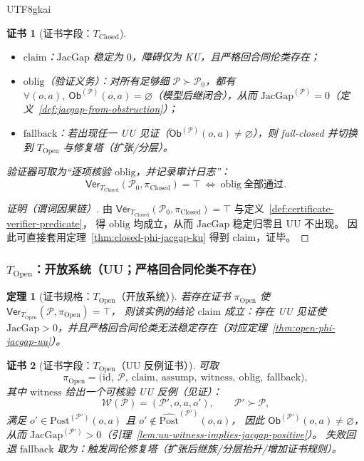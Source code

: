 \documentclass[12pt]{article}
\newtheorem{theorem}{定理}[section]
\newtheorem{Certificate}{证书}[section]
\newcommand{\JacGap}{\ensuremath{\mathrm{JacGap}}} %
\begin{document}
\begin{CJK*}{UTF8}{gkai}
\begin{Certificate}[证书字段：$T_{\mathrm{Closed}}$]
\begin{itemize}
  \item $\mathrm{claim}$：$\JacGap$ 稳定为 $0$，障碍仅为 KU，且严格回合同伦类存在；
  \item $\mathrm{oblig}$（验证义务）：对所有足够细 $\mathcal{P}\succ\mathcal{P}_0$，都有
  $\forall(o,a),\ \mathsf{Ob}^{(\mathcal{P})}(o,a)=\varnothing$（模型后继闭合），从而 $\JacGap^{(\mathcal{P})}=0$（定义~\ref{def:jacgap-from-obstruction}）；
  \item $\mathrm{fallback}$：若出现任一 UU 见证（$\mathsf{Ob}^{(\mathcal{P})}(o,a)\neq\varnothing$），则 fail-closed 并切换到
    $T_{\mathrm{Open}}$ 与修复塔（扩张/分层）。
\end{itemize}
验证器可取为“逐项核验 $\mathrm{oblig}$，并记录审计日志”：
\[
  \mathsf{Ver}_{T_{\mathrm{Closed}}}(\mathcal{P}_0,\pi_{\mathrm{Closed}})=\top\ \Longleftrightarrow\ \mathrm{oblig}\
    \text{全部通过}.
\]
\end{Certificate}

\begin{proof}[证明（谓词因果链）]
由 $\mathsf{Ver}_{T_{\mathrm{Closed}}}(\mathcal{P}_0,\pi_{\mathrm{Closed}})=\top$ 与定义~\ref{def:certificate-verifier-predicate}，
得 $\mathrm{oblig}$ 均成立，从而 $\JacGap$ 稳定归零且 UU 不出现。
因此可直接套用定理~\ref{thm:closed-phi-jacgap-ku} 得到 $\mathrm{claim}$，证毕。
\end{proof}

\subsubsection{$T_{\mathrm{Open}}$：开放系统（UU；严格回合同伦类不存在）}
\label{sec:certschema-t-open}

\begin{theorem}[证书规格：$T_{\mathrm{Open}}$（开放系统）]
\label{thm:certspec-t-open}
若存在证书 $\pi_{\mathrm{Open}}$ 使
$\mathsf{Ver}_{T_{\mathrm{Open}}}(\mathcal{P},\pi_{\mathrm{Open}})=\top$，
则该实例的结论 $\mathrm{claim}$ 成立：存在 UU 见证使 $\JacGap>0$，并且严格回合同伦类无法稳定存在（对应定理~\ref{thm:open-phi-jacgap-uu}）。
\end{theorem}

\begin{Certificate}[证书字段：$T_{\mathrm{Open}}$（UU 反例证书）]
\label{cert:certspec-t-open}
可取
\[
  \pi_{\mathrm{Open}}=
  \bigl(\mathrm{id},\ \mathcal{P},\ \mathrm{claim},\ \mathrm{assump},\ \mathrm{witness},\ \mathrm{oblig},\
    \mathrm{fallback}\bigr),
\]
其中 $\mathrm{witness}$ 给出一个可核验 UU 反例（见证）：
\[
  \mathcal{W}(\mathcal{P})=(\mathcal{P}',o,a,o'),\qquad \mathcal{P}'\succ\mathcal{P},
\]
满足
$o'\in \mathrm{Post}^{(\mathcal{P}')}(o,a)$ 且 $o'\notin \widehat{\mathrm{Post}}^{(\mathcal{P}')}(o,a)$，
因此 $\mathsf{Ob}^{(\mathcal{P}')}(o,a)\neq\varnothing$，
从而 $\JacGap^{(\mathcal{P}')}>0$（引理~\ref{lem:uu-witness-implies-jacgap-positive}）。
失败回退 $\mathrm{fallback}$ 取为：触发同伦修复塔（扩张后继族/分层抬升/增加证书规则）。
\end{Certificate}


\end{CJK*}
\end{document}
